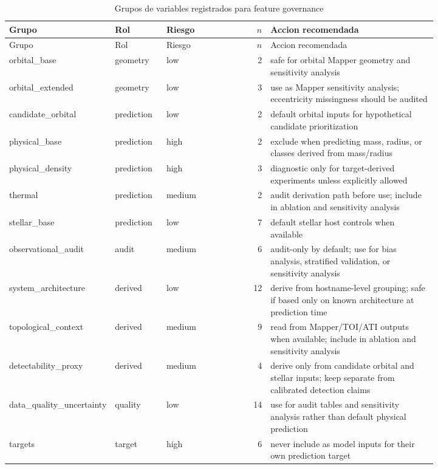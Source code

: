 \begin{longtable}{p{0.20\linewidth}p{0.12\linewidth}p{0.11\linewidth}rp{0.39\linewidth}}
\caption{Grupos de variables registrados para feature governance}\label{tab:feature-groups}\\
\toprule
Grupo & Rol & Riesgo & $n$ & Accion recomendada \\
\midrule
\endfirsthead
\toprule
Grupo & Rol & Riesgo & $n$ & Accion recomendada \\
\midrule
\endhead
orbital\_base & geometry & low & 2 & safe for orbital Mapper geometry and sensitivity analysis \\
orbital\_extended & geometry & low & 3 & use as Mapper sensitivity analysis; eccentricity missingness should be audited \\
candidate\_orbital & prediction & low & 2 & default orbital inputs for hypothetical candidate prioritization \\
physical\_base & prediction & high & 2 & exclude when predicting mass, radius, or classes derived from mass/radius \\
physical\_density & prediction & high & 3 & diagnostic only for target-derived experiments unless explicitly allowed \\
thermal & prediction & medium & 2 & audit derivation path before use; include in ablation and sensitivity analysis \\
stellar\_base & prediction & low & 7 & default stellar host controls when available \\
observational\_audit & audit & medium & 6 & audit-only by default; use for bias analysis, stratified validation, or sensitivity analysis \\
system\_architecture & derived & low & 12 & derive from hostname-level grouping; safe if based only on known architecture at prediction time \\
topological\_context & derived & medium & 9 & read from Mapper/TOI/ATI outputs when available; include in ablation and sensitivity analysis \\
detectability\_proxy & derived & medium & 4 & derive only from candidate orbital and stellar inputs; keep separate from calibrated detection claims \\
data\_quality\_uncertainty & quality & low & 14 & use for audit tables and sensitivity analysis rather than default physical prediction \\
targets & target & high & 6 & never include as model inputs for their own prediction target \\
\bottomrule
\end{longtable}
